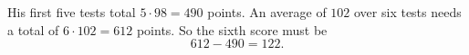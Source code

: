 His first five tests total $5\cdot98=490$ points. An average of $102$ over six tests needs a total of $6\cdot102=612$ points. So the sixth score must be
\[
612-490=\boxed{122}.
\]
